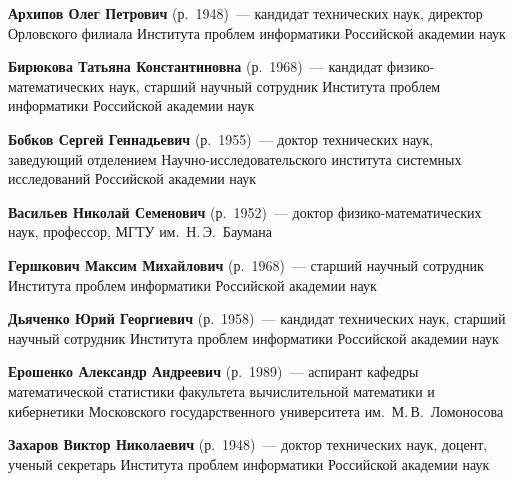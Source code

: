 \begin{multicols}{2}




\noindent
\textbf{Архипов Олег Петрович} (р.\ 1948)~---
кандидат технических наук, директор Орловского филиала Института проб\-лем информатики
Российской академии наук

\vspace*{3pt}

\noindent
\textbf{Бирюкова Татьяна Константиновна} (р.\ 1968)~---
кандидат фи\-зи\-ко-ма\-те\-ма\-ти\-че\-ских наук, старший научный сотрудник Института проб\-лем информатики
Российской академии наук

\vspace*{3pt}

\noindent 
\textbf{Бобков  Сергей Геннадьевич} (р.\ 1955)~---
доктор технических наук,  заведующий отделением На\-уч\-но-ис\-сле\-до\-ва\-тель\-ско\-го 
института системных исследований Российской академии наук

\vspace*{3pt}

\noindent \textbf{Васильев Николай Семенович} (р.\ 1952)~--- доктор 
фи\-зи\-ко-ма\-те\-ма\-ти\-че\-ских наук, профессор, 
МГТУ им.\ Н.\,Э.~Баумана 

\vspace*{3pt}

\noindent
\textbf{Гершкович Максим Михайлович} (р.\ 1968)~---
старший научный сотрудник Института проб\-лем информатики
Российской академии наук

\vspace*{3pt}

\noindent 
\textbf{Дьяченко Юрий Георгиевич} (р.\ 1958)~--- кандидат технических наук, 
старший научный сотрудник Института проб\-лем информатики
Российской академии наук

\vspace*{3pt}

\noindent 
\textbf{Ерошенко Александр Андреевич} (р.\ 1989)~--- аспирант кафедры 
математической статистики факультета вычисли\-тельной математики и кибернетики 
Московского государственного университета им.\ М.\,В.~Ломоносова

\vspace*{3pt}
 
\noindent 
\textbf{Захаров Виктор Николаевич} (р.\ 1948)~--- 
доктор технических наук, доцент, ученый секретарь Института проб\-лем информатики
Российской академии наук


\end{multicols}
